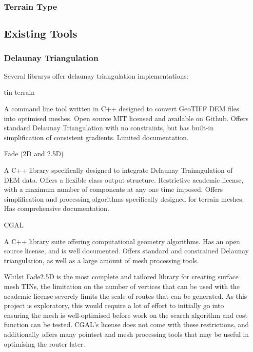 \documentclass[12pt]{article}
\begin{document}
\subsubsection{Terrain Type}

\subsection{Existing Tools}

\subsubsection{Delaunay Triangulation}

Several librarys offer delaunay triangulation implementations:

\begin{itemize}

  \itemize tin-terrain

  A command line tool written in C++ designed to convert GeoTIFF DEM files into optimised meshes. Open source MIT licensed and available on Github. Offers standard Delaunay Triangulation with no constraints, but has built-in simplification of consistent gradients. Limited documentation.

  \itemize Fade (2D and 2.5D)

  A C++ library specifically designed to integrate Delaunay Trainagulation of DEM data. Offers a flexible class output structure. Restrictive academic license, with a maximum number of components at any one time imposed. Offers simplification and processing algorithms specifically designed for terrain meshes. Has comprehensive documentation.

  \itemize CGAL

  A C++ library suite offering computational geometry algorithms. Has an open source license, and is well documented. Offers standard and constrained Delaunay triangulation, as well as a large amount of mesh processing tools.

\end{itemize}

Whilst Fade2.5D is the most complete and tailored library for creating surface mesh TINs, the limitation on the number of vertices that can be used with the academic license severely limits the scale of routes that can be generated. As this project is exploratory, this would require a lot of effort to initially go into ensuring the mesh is well-optimised before work on the search algorithm and cost function can be tested. CGAL's license does not come with these restrictions, and additionally offers many pointset and mesh processing tools that may be useful in optimising the router later.
\end{document}
